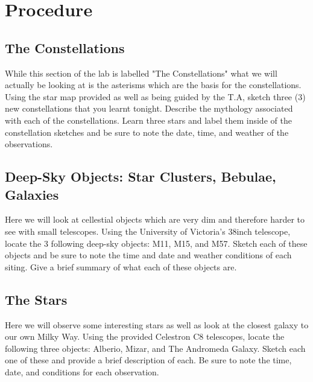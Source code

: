 \documentclass{article}
\begin{document}

\section{Procedure}

\subsection{The Constellations}
While this section of the lab is labelled "The Constellations" what we will actually be looking at is the asterisms which are the
basis for the constellations. Using the star map provided as well as being guided by the T.A, sketch three (3) new constellations
that you learnt tonight. Describe the mythology associated with each of the constellations. Learn three stars and label them 
inside of the constellation sketches and be sure to note the date, time, and weather of the observations.

\subsection{Deep-Sky Objects: Star Clusters, Bebulae, Galaxies}
Here we will look at cellestial objects which are very dim and therefore harder to see with small telescopes. Using the 
University of Victoria's 38inch telescope, locate the 3 following deep-sky objects: M11, M15, and M57. Sketch each of these
objects and be sure to note the time and date and weather conditions of each siting. Give a brief summary of what each
of these objects are.

\subsection{The Stars}
Here we will observe some interesting stars as well as look at the closest galaxy to our own Milky Way. Using the provided
Celestron C8 telescopes, locate the following three objects: Alberio, Mizar, and The Andromeda Galaxy. Sketch each one of these
and provide a brief description of each. Be sure to note the time, date, and conditions for each observation.


\end{document}
